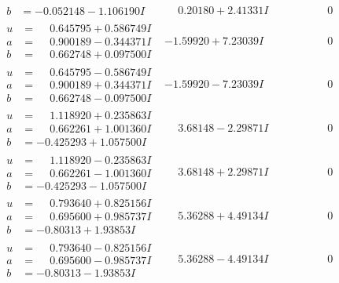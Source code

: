 \documentclass[1p]{elsarticle_modified}
\theoremstyle{definition}
\begin{document}
$$\begin{array}{c|c|c}
\begin{aligned}
b &= -0.052148 - 1.106190 I\end{aligned}
 & \phantom{-}0.20180 + 2.41331 I & \phantom{-0.000000 } 0 \\ \hline\begin{aligned}
u &= \phantom{-}0.645795 + 0.586749 I \\
a &= \phantom{-}0.900189 - 0.344371 I \\
b &= \phantom{-}0.662748 + 0.097500 I\end{aligned}
 & -1.59920 + 7.23039 I & \phantom{-0.000000 } 0 \\ \hline\begin{aligned}
u &= \phantom{-}0.645795 - 0.586749 I \\
a &= \phantom{-}0.900189 + 0.344371 I \\
b &= \phantom{-}0.662748 - 0.097500 I\end{aligned}
 & -1.59920 - 7.23039 I & \phantom{-0.000000 } 0 \\ \hline\begin{aligned}
u &= \phantom{-}1.118920 + 0.235863 I \\
a &= \phantom{-}0.662261 + 1.001360 I \\
b &= -0.425293 + 1.057500 I\end{aligned}
 & \phantom{-}3.68148 - 2.29871 I & \phantom{-0.000000 } 0 \\ \hline\begin{aligned}
u &= \phantom{-}1.118920 - 0.235863 I \\
a &= \phantom{-}0.662261 - 1.001360 I \\
b &= -0.425293 - 1.057500 I\end{aligned}
 & \phantom{-}3.68148 + 2.29871 I & \phantom{-0.000000 } 0 \\ \hline\begin{aligned}
u &= \phantom{-}0.793640 + 0.825156 I \\
a &= \phantom{-}0.695600 + 0.985737 I \\
b &= -0.80313 + 1.93853 I\end{aligned}
 & \phantom{-}5.36288 + 4.49134 I & \phantom{-0.000000 } 0 \\ \hline\begin{aligned}
u &= \phantom{-}0.793640 - 0.825156 I \\
a &= \phantom{-}0.695600 - 0.985737 I \\
b &= -0.80313 - 1.93853 I\end{aligned}
 & \phantom{-}5.36288 - 4.49134 I & \phantom{-0.000000 } 0\\

\end{array}$$
\end{document}
